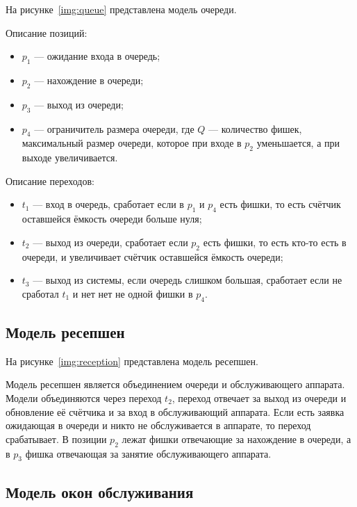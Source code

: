 На рисунке~\ref{img:queue} представлена модель очереди.

\FloatBarrier

Описание позиций:
\begin{itemize}[label=---]
	\item $p_1$ --- ожидание входа в очередь;
	\item $p_2$ --- нахождение в очереди;
	\item $p_3$ --- выход из очереди;
	\item $p_4$ --- ограничитель размера очереди, где $Q$ --- количество фишек, максимальный размер очереди, которое при входе в $p_2$ уменьшается, а при выходе увеличивается.
\end{itemize}
Описание переходов:
\begin{itemize}[label=---]
	\item $t_1$ --- вход в очередь, сработает если в $p_1$ и $p_4$ есть фишки, то есть счётчик оставшейся ёмкость очереди больше нуля;
	\item $t_2$ --- выход из очереди, сработает если $p_2$ есть фишки, то есть кто-то есть в очереди, и увеличивает счётчик оставшейся ёмкость очереди;
	\item $t_3$ --- выход из системы, если очередь слишком большая, сработает если не сработал $t_1$ и нет нет не одной фишки в $p_4$.
\end{itemize}

\subsection{Модель ресепшен}

На рисунке~\ref{img:reception} представлена модель ресепшен.

\FloatBarrier

Модель ресепшен является объединением очереди и обслуживающего аппарата. Модели объединяются через переход $t_2$, переход отвечает за выход из очереди и обновление её счётчика и за вход в обслуживающий аппарата. Если есть заявка ожидающая в очереди и никто не обслуживается в аппарате, то переход срабатывает. В позиции $p_2$ лежат фишки отвечающие за нахождение в очереди, а в $p_3$ фишка отвечающая за занятие обслуживающего аппарата.

\subsection{Модель окон обслуживания}

